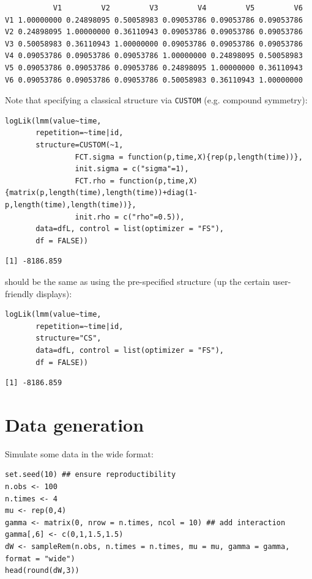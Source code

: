 \documentclass[12pt]{article}
\begin{document}
\begin{verbatim}
           V1         V2         V3         V4         V5         V6
V1 1.00000000 0.24898095 0.50058983 0.09053786 0.09053786 0.09053786
V2 0.24898095 1.00000000 0.36110943 0.09053786 0.09053786 0.09053786
V3 0.50058983 0.36110943 1.00000000 0.09053786 0.09053786 0.09053786
V4 0.09053786 0.09053786 0.09053786 1.00000000 0.24898095 0.50058983
V5 0.09053786 0.09053786 0.09053786 0.24898095 1.00000000 0.36110943
V6 0.09053786 0.09053786 0.09053786 0.50058983 0.36110943 1.00000000
\end{verbatim}


Note that specifying a classical structure via \texttt{CUSTOM} (e.g. compound symmetry):
\lstset{language=r,label= ,caption= ,captionpos=b,numbers=none}
\begin{lstlisting}
logLik(lmm(value~time,
	   repetition=~time|id,
	   structure=CUSTOM(~1,
			    FCT.sigma = function(p,time,X){rep(p,length(time))},
			    init.sigma = c("sigma"=1),
			    FCT.rho = function(p,time,X){matrix(p,length(time),length(time))+diag(1-p,length(time),length(time))},
			    init.rho = c("rho"=0.5)), 
	   data=dfL, control = list(optimizer = "FS"),
	   df = FALSE))
\end{lstlisting}

\begin{verbatim}
[1] -8186.859
\end{verbatim}


should be the same as using the pre-specified structure (up the
certain user-friendly displays):
\lstset{language=r,label= ,caption= ,captionpos=b,numbers=none}
\begin{lstlisting}
logLik(lmm(value~time,
	   repetition=~time|id,
	   structure="CS", 
	   data=dfL, control = list(optimizer = "FS"),
	   df = FALSE))
\end{lstlisting}

\begin{verbatim}
[1] -8186.859
\end{verbatim}


\clearpage

\section{Data generation}
\label{sec:orgeaa188f}
Simulate some data in the wide format:
\lstset{language=r,label= ,caption= ,captionpos=b,numbers=none}
\begin{lstlisting}
set.seed(10) ## ensure reproductibility
n.obs <- 100
n.times <- 4
mu <- rep(0,4)
gamma <- matrix(0, nrow = n.times, ncol = 10) ## add interaction
gamma[,6] <- c(0,1,1.5,1.5)
dW <- sampleRem(n.obs, n.times = n.times, mu = mu, gamma = gamma, format = "wide")
head(round(dW,3))
\end{lstlisting}
\end{document}
